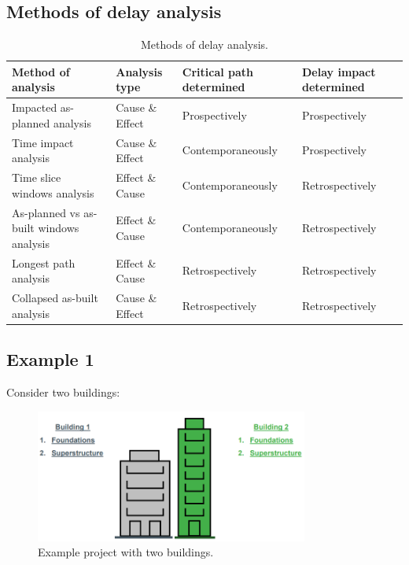 \subsection{Methods of delay analysis}
\begin{table}[H]
    \centering
    \begin{tabular}{@{}llll@{}}
        \toprule
        \textbf{Method of analysis}             & \textbf{Analysis type} & \textbf{Critical path determined} & \textbf{Delay impact determined} \\
        \midrule
        Impacted as-planned analysis            & Cause \& Effect        & Prospectively                     & Prospectively                    \\
        Time impact analysis                    & Cause \& Effect        & Contemporaneously                 & Prospectively                    \\
        Time slice windows analysis             & Effect \& Cause        & Contemporaneously                 & Retrospectively                  \\
        As-planned vs as-built windows analysis & Effect \& Cause        & Contemporaneously                 & Retrospectively                  \\
        Longest path analysis                   & Effect \& Cause        & Retrospectively                   & Retrospectively                  \\
        Collapsed as-built analysis             & Cause \& Effect        & Retrospectively                   & Retrospectively                  \\
        \bottomrule
    \end{tabular}
    \caption{Methods of delay analysis.}
\end{table}
\subsection{Example 1}
Consider two buildings:
\begin{figure}[H]
    \centering
    \includegraphics[width = 0.8\textwidth]{img/figure30.png}
    \caption{Example project with two buildings.}
\end{figure}
